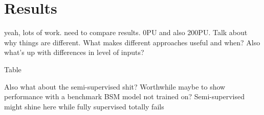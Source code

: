 \section{Results}
\label{sec:results}

yeah, lots of work. need to compare results. 0PU and also 200PU. Talk about why things are different. What makes different approaches useful and when? Also what's up with differences in level of inputs?

Table

Also what about the semi-supervised shit? Worthwhile maybe to show performance with a benchmark BSM model not trained on? Semi-supervised might shine here while fully supervised totally fails
